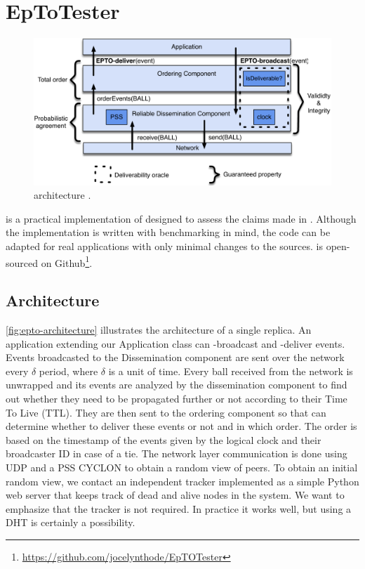\section{EpToTester}
\label{sec:epto}
\begin{figure}[htp]
	\includegraphics[width=\linewidth]{figures/architecture.pdf}
	\caption{\epto architecture \autocite{matos2015epto}.}
	\label{fig:epto-architecture}
\end{figure}
\eptotester is a practical implementation of \epto designed to assess the claims made in \autocite{matos2015epto}. Although the implementation is written with benchmarking in mind, the code can be adapted for real applications with only minimal changes to the sources. \eptotester is open-sourced on Github\footnote{\href{https://github.com/jocelynthode/EpTOTester}{https://github.com/jocelynthode/EpTOTester}}.
\subsection{Architecture}
\autoref{fig:epto-architecture} illustrates the architecture of a single replica. An application extending our Application class can \epto-broadcast and \epto-deliver events. Events broadcasted to the Dissemination component are sent over the network every $\delta$ period, where $\delta$ is a unit of time. Every ball received from the network is unwrapped and its events are analyzed by the dissemination component to find out whether they need to be propagated further or not according to their Time To Live (TTL). They are then sent to the ordering component so that \epto can determine whether to deliver these events or not and in which order. The order is based on the timestamp of the events given by the logical clock and their broadcaster ID in case of a tie. The network layer communication is done using UDP and a PSS CYCLON to obtain a random view of peers. To obtain an initial random view, we contact an independent tracker implemented as a simple Python web server that keeps track of dead and alive nodes in the system. We want to emphasize that the tracker is not required. In practice it works well, but using a DHT is certainly a possibility.
